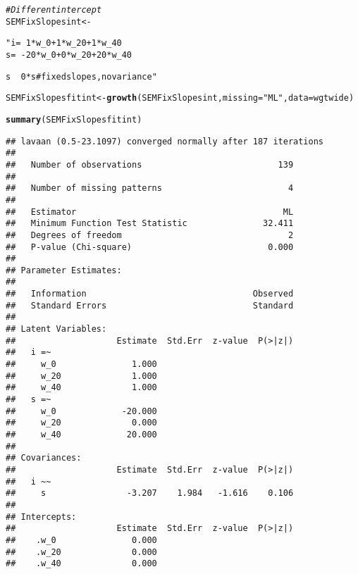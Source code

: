\documentclass{article}\usepackage[]{graphicx}\usepackage[]{color}
\makeatletter
\newcommand{\hlstr}[1]{\textcolor[rgb]{0.192,0.494,0.8}{#1}}%
\newcommand{\hlcom}[1]{\textcolor[rgb]{0.678,0.584,0.686}{\textit{#1}}}%
\newcommand{\hlstd}[1]{\textcolor[rgb]{0.345,0.345,0.345}{#1}}%
\newcommand{\hlkwb}[1]{\textcolor[rgb]{0.69,0.353,0.396}{#1}}%
\newcommand{\hlkwc}[1]{\textcolor[rgb]{0.333,0.667,0.333}{#1}}%
\newcommand{\hlkwd}[1]{\textcolor[rgb]{0.737,0.353,0.396}{\textbf{#1}}}%
\newenvironment{kframe}{%
 \def\at@end@of@kframe{}%
 \ifinner\ifhmode%
  \def\at@end@of@kframe{\end{minipage}}%
  \begin{minipage}{\columnwidth}%
 \fi\fi%
 \def\FrameCommand##1{\hskip\@totalleftmargin \hskip-\fboxsep
 \colorbox{shadecolor}{##1}\hskip-\fboxsep
     \hskip-\linewidth \hskip-\@totalleftmargin \hskip\columnwidth}%
 \MakeFramed {\advance\hsize-\width
   \@totalleftmargin\z@ \linewidth\hsize
   \@setminipage}}%
 {\par\unskip\endMakeFramed%
 \at@end@of@kframe}
\newenvironment{knitrout}{}{} %
\makeatother
\begin{document}
\begin{knitrout}
\begin{kframe}
\begin{alltt}
\hlcom{# Different intercept}
\hlstd{SEMFixSlopesint} \hlkwb{<-} \hlstr{" i =~ 1*w_0 + 1*w_20 + 1*w_40
                  s =~ -20*w_0 + 0*w_20 + 20*w_40

                  s ~~ 0*s #fixed slopes, no variance"}
\hlstd{SEMFixSlopesfitint} \hlkwb{<-} \hlkwd{growth}\hlstd{(SEMFixSlopesint,} \hlkwc{missing} \hlstd{=} \hlstr{"ML"}\hlstd{,} \hlkwc{data} \hlstd{= wgtwide)}
\end{alltt}


{\ttfamily\noindent{}}\begin{alltt}
\hlkwd{summary}\hlstd{(SEMFixSlopesfitint)}
\end{alltt}
\begin{verbatim}
## lavaan (0.5-23.1097) converged normally after 187 iterations
## 
##   Number of observations                           139
## 
##   Number of missing patterns                         4
## 
##   Estimator                                         ML
##   Minimum Function Test Statistic               32.411
##   Degrees of freedom                                 2
##   P-value (Chi-square)                           0.000
## 
## Parameter Estimates:
## 
##   Information                                 Observed
##   Standard Errors                             Standard
## 
## Latent Variables:
##                    Estimate  Std.Err  z-value  P(>|z|)
##   i =~                                                
##     w_0               1.000                           
##     w_20              1.000                           
##     w_40              1.000                           
##   s =~                                                
##     w_0             -20.000                           
##     w_20              0.000                           
##     w_40             20.000                           
## 
## Covariances:
##                    Estimate  Std.Err  z-value  P(>|z|)
##   i ~~                                                
##     s                -3.207    1.984   -1.616    0.106
## 
## Intercepts:
##                    Estimate  Std.Err  z-value  P(>|z|)
##    .w_0               0.000                           
##    .w_20              0.000                           
##    .w_40              0.000                           

\end{verbatim}
\end{kframe}
\end{knitrout}
\end{document}
